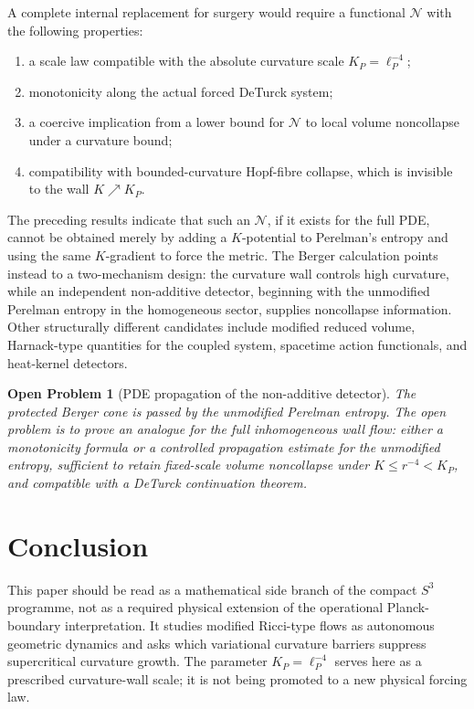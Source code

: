 \documentclass[11pt]{amsart}
\newtheorem{openproblem}{Open Problem}
\newcommand{\KP}{K_{\!P}}
\newcommand{\Ncal}{\mathcal N}
\begin{document}
A complete internal replacement for surgery would require a functional
\(\Ncal\) with the following properties:
\begin{enumerate}[label=(\roman*)]
\item a scale law compatible with the absolute curvature scale
\(\KP=\ell_P^{-4}\);
\item monotonicity along the actual forced DeTurck system;
\item a coercive implication from a lower bound for \(\Ncal\) to local volume
noncollapse under a curvature bound;
\item compatibility with bounded-curvature Hopf-fibre collapse, which is
invisible to the wall \(K\nearrow\KP\).
\end{enumerate}

The preceding results indicate that such an \(\Ncal\), if it exists for the
full PDE, cannot be obtained merely by adding a \(K\)-potential to Perelman's
entropy and using the same \(K\)-gradient to force the metric.  The Berger
calculation points instead to a two-mechanism design: the curvature wall
controls high curvature, while an independent non-additive detector, beginning
with the unmodified Perelman entropy in the homogeneous sector, supplies
noncollapse information.  Other structurally different candidates include
modified reduced volume, Harnack-type quantities for the coupled system,
spacetime action functionals, and heat-kernel detectors.

\begin{openproblem}[PDE propagation of the non-additive detector]
The protected Berger cone is passed by the unmodified Perelman entropy.  The
open problem is to prove an analogue for the full inhomogeneous wall flow:
either a monotonicity formula or a controlled propagation estimate for the
unmodified entropy, sufficient to retain fixed-scale volume noncollapse under
\(K\le r^{-4}<\KP\), and compatible with a DeTurck continuation theorem.
\end{openproblem}

\section{Conclusion}

This paper should be read as a mathematical side branch of the compact \(S^3\)
programme, not as a required physical extension of the operational
Planck-boundary interpretation.  It studies modified Ricci-type flows as
autonomous geometric dynamics and asks which variational curvature barriers
suppress supercritical curvature growth.  The parameter \(\KP=\ell_P^{-4}\)
serves here as a prescribed curvature-wall scale; it is not being promoted to a
new physical forcing law.
\end{document}
